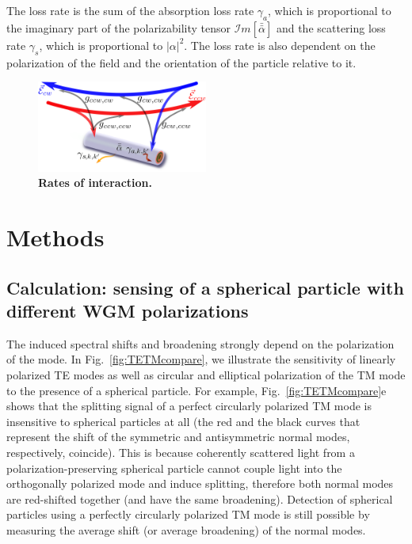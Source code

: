 \documentclass[journal=jacsat,manuscript=article]{achemso}
\begin{document}
The loss rate is the sum of the absorption loss rate $\gamma_a$, which is proportional to the imaginary part of the polarizability tensor $\mathcal{I}m[\bar{ \bar \alpha}]$ and the scattering loss rate $\gamma_s$, which is proportional to $|\alpha|^2$. The loss rate is also dependent on the polarization of the field and the orientation of the particle relative to it.
\begin{figure}[H]
\centering
             \includegraphics[trim=0cm 0.0cm 0.0cm 0.0cm, clip, width=0.5\textwidth]{Images/interaction.png}
             \caption{\textbf{Rates of interaction.} }
              \label{fig:cavity_tube_int}
  \end{figure}\vspace{-1cm}

\section{Methods}

\subsection{Calculation: sensing of a spherical particle with different WGM polarizations}

The induced spectral shifts and broadening strongly depend on the polarization of the mode.  In Fig.~\ref{fig:TETMcompare}, we illustrate the sensitivity of linearly polarized TE modes as well as circular and elliptical polarization of the TM mode to the presence of a spherical particle. For example, Fig.~\ref{fig:TETMcompare}e shows that the splitting signal of a perfect circularly polarized TM mode is insensitive to spherical particles at all (the red and the black curves that represent the shift of the symmetric and antisymmetric normal modes, respectively, coincide). This is because coherently scattered light from a polarization-preserving spherical particle cannot couple light into the orthogonally polarized mode and induce splitting, therefore both normal modes are red-shifted together (and have the same broadening). Detection of spherical particles using a perfectly circularly polarized TM mode is still possible by measuring the average shift (or average broadening) of the normal modes.
\end{document}
